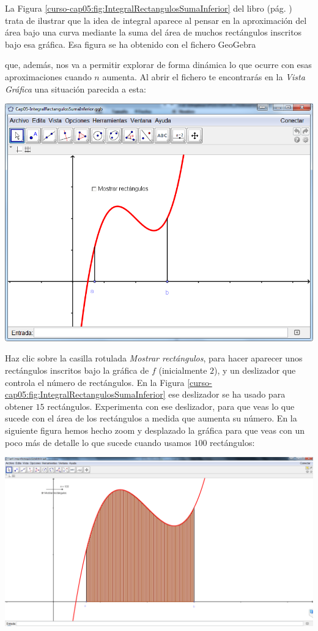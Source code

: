 \documentclass[10pt,a4paper]{article}\usepackage[]{graphicx}\usepackage[]{color}
\newcounter{cont01}
\begin{document}
La Figura \ref{curso-cap05:fig:IntegralRectangulosSumaInferior} del libro (pág. \pageref{curso-cap05:fig:IntegralRectangulosSumaInferior}) trata de ilustrar que la idea de integral aparece al pensar en la aproximación del área bajo una curva mediante la suma del área de muchos rectángulos inscritos bajo esa gráfica. Esa figura se ha obtenido con el fichero GeoGebra
\begin{center}
\end{center}
que, además, nos va a permitir explorar de forma dinámica lo que ocurre con esas aproximaciones cuando $n$ aumenta. Al abrir el fichero te encontrarás en la {\em Vista Gráfica} una situación parecida a esta:
\begin{center}
    \includegraphics[width=15cm]{../fig/Tut05-38.png}
\end{center}
Haz clic sobre la casilla rotulada {\em Mostrar rectángulos}, para hacer aparecer unos rectángulos inscritos bajo la gráfica de $f$ (inicialmente $2$), y un deslizador que controla el número de rectángulos. En la Figura \ref{curso-cap05:fig:IntegralRectangulosSumaInferior} ese deslizador se ha usado para obtener $15$ rectángulos. Experimenta con ese deslizador, para que veas lo que sucede con el área de los rectángulos a medida que aumenta su número. En la siguiente figura hemos hecho zoom y desplazado la gráfica para que veas con un poco más de detalle lo que sucede cuando usamos $100$ rectángulos:
\begin{center}
    \includegraphics[width=15cm]{../fig/Tut05-39.png}
\end{center}
\end{document}
